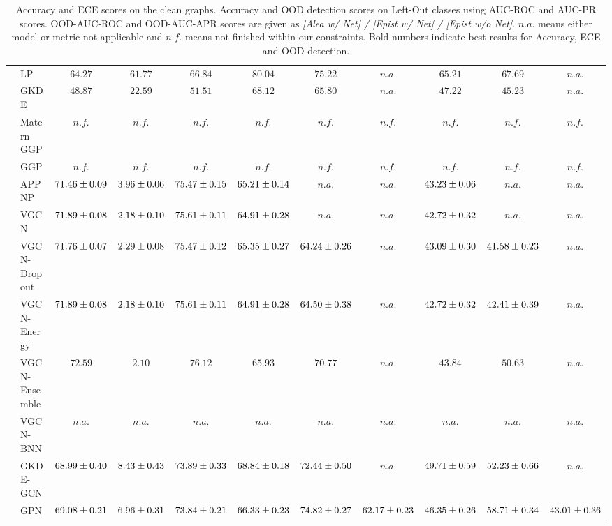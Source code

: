 \begin{table*}[!h]
{\begin{tabular}{ll|cc|cccc|ccc}
        & LP & ${64.27}$ & ${61.77}$ & ${66.84}$ & ${\mathbf {80.04}}$ & ${{75.22}}$ & $n.a.$ & ${{65.21}}$ & ${\mathbf{67.69}}$ & $n.a.$\\
        & GKDE & ${48.87}$ & ${22.59}$ & ${51.51}$ & ${68.12}$ & ${65.80}$ & $n.a.$ & ${47.22}$ & ${45.23}$ & $n.a.$\\
        & Matern-GGP & $n.f.$ & $n.f.$ & $n.f.$ & $n.f.$ & $n.f.$ & $n.f.$ & $n.f.$ & $n.f.$ & $n.f.$\\
        & GGP & $n.f.$ & $n.f.$ & $n.f.$ & $n.f.$ & $n.f.$ & $n.f.$ & $n.f.$ & $n.f.$ & $n.f.$\\
        & APPNP & ${71.46\tiny \pm 0.09}$ & ${3.96\tiny \pm 0.06}$ & ${75.47\tiny \pm 0.15}$ & ${65.21\tiny \pm 0.14}$ & $n.a.$ & $n.a.$ & ${43.23\tiny \pm 0.06}$ & $n.a.$ & $n.a.$\\
        & VGCN & ${71.89\tiny \pm 0.08}$ & ${2.18\tiny \pm 0.10}$ & ${75.61\tiny \pm 0.11}$ & ${64.91\tiny \pm 0.28}$ & $n.a.$ & $n.a.$ & ${42.72\tiny \pm 0.32}$ & $n.a.$ & $n.a.$\\
        & VGCN-Dropout & ${71.76\tiny \pm 0.07}$ & ${2.29\tiny \pm 0.08}$ & ${75.47\tiny \pm 0.12}$ & ${65.35\tiny \pm 0.27}$ & ${64.24\tiny \pm 0.26}$ & $n.a.$ & ${43.09\tiny \pm 0.30}$ & ${41.58\tiny \pm 0.23}$ & $n.a.$\\
        & VGCN-Energy & ${71.89\tiny \pm 0.08}$ & ${2.18\tiny \pm 0.10}$ & ${75.61\tiny \pm 0.11}$ & ${64.91\tiny \pm 0.28}$ & ${64.50\tiny \pm 0.38}$ & $n.a.$ & ${42.72\tiny \pm 0.32}$ & ${42.41\tiny \pm 0.39}$ & $n.a.$\\
        & VGCN-Ensemble & ${\mathbf{72.59}}$ & ${\mathbf{2.10}}$ & ${\mathbf{76.12}}$ & ${65.93}$ & ${70.77}$ & $n.a.$ & ${43.84}$ & ${50.63}$ & $n.a.$\\
        & VGCN-BNN & $n.a.$ & $n.a.$ & $n.a.$ & $n.a.$ & $n.a.$ & $n.a.$ & $n.a.$ & $n.a.$ & $n.a.$\\
        & GKDE-GCN & ${68.99\tiny \pm 0.40}$ & ${8.43\tiny \pm 0.43}$ & ${73.89\tiny \pm 0.33}$ & ${68.84\tiny \pm 0.18}$ & ${72.44\tiny \pm 0.50}$ & $n.a.$ & ${49.71\tiny \pm 0.59}$ & ${52.23\tiny \pm 0.66}$ & $n.a.$\\
        & GPN & ${69.08\tiny \pm 0.21}$ & ${6.96\tiny \pm 0.31}$ & ${73.84\tiny \pm 0.21}$ & ${66.33\tiny \pm 0.23}$ & ${74.82\tiny \pm 0.27}$ & ${{62.17}\tiny \pm 0.23}$ & ${46.35\tiny \pm 0.26}$ & ${58.71\tiny \pm 0.34}$ & ${{43.01}\tiny \pm 0.36}$\\
        \bottomrule
    \end{tabular}}
    \caption{Accuracy and ECE scores on the clean graphs. Accuracy and OOD detection scores on Left-Out classes using AUC-ROC and AUC-PR scores. OOD-AUC-ROC and OOD-AUC-APR scores are given as \emph{[Alea w/ Net] / [Epist w/ Net] / [Epist w/o Net]}. $n.a.$ means either model or metric not applicable and $n.f.$ means not finished within our constraints. Bold numbers indicate best results for Accuracy, ECE and OOD detection.}
    \label{tab:clean_loc_auroc_two}
\end{table*}





